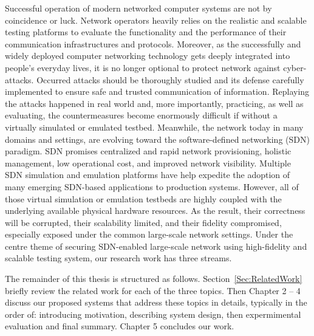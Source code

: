 Successful operation of modern networked computer systems are not by coincidence or luck.
Network operators heavily relies on the realistic and scalable testing platforms to
evaluate the functionality and the performance of their communication infrastructures and protocols.
Moreover, as the successfully and widely deployed computer networking technology gets deeply integrated into people's everyday lives,
it is no longer optional to protect network against cyber-attacks.
Occurred attacks should be thoroughly studied and its defense carefully implemented to ensure safe and trusted communication of information.
Replaying the attacks happened in real world and, more importantly, practicing, as well as evaluating, the countermeasures become 
enormously difficult if without a virtually simulated or emulated testbed.
Meanwhile, the network today in many domains and settings, are evolving toward the software-defined networking (SDN) paradigm.
SDN promises centralized and rapid network provisioning, holistic management, low operational cost, and improved network visibility.
Multiple SDN simulation and emulation platforms have help expedite the adoption of many emerging SDN-based applications to production systems.
However, all of those virtual simulation or emulation testbeds are highly coupled with the underlying available physical hardware resources.
As the result, their correctness will be corrupted, their scalability limited, and their fidelity compromised,
especially exposed under the common large-scale network settings.
Under the centre theme of securing SDN-enabled large-scale network using high-fidelity and scalable testing system, our research work has three streams.





The remainder of this thesis is structured as follows.
Section~\ref{Sec:RelatedWork} briefly review the related work for each of the three topics.
Then Chapter 2 -- 4 discuss our proposed systems that address these topics in details,
typically in the order of: introducing motivation, describing system design,
then expermimental evaluation and final summary.
Chapter 5 concludes our work.

